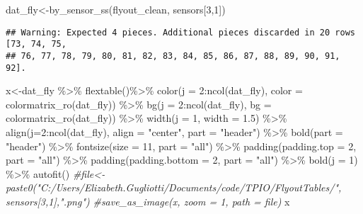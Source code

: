 \documentclass[
]{article}
\newenvironment{Shaded}{\begin{snugshade}}{\end{snugshade}}
\newcommand{\AttributeTok}[1]{\textcolor[rgb]{0.77,0.63,0.00}{#1}}
\newcommand{\CommentTok}[1]{\textcolor[rgb]{0.56,0.35,0.01}{\textit{#1}}}
\newcommand{\DecValTok}[1]{\textcolor[rgb]{0.00,0.00,0.81}{#1}}
\newcommand{\FloatTok}[1]{\textcolor[rgb]{0.00,0.00,0.81}{#1}}
\newcommand{\FunctionTok}[1]{\textcolor[rgb]{0.00,0.00,0.00}{#1}}
\newcommand{\NormalTok}[1]{#1}
\newcommand{\OtherTok}[1]{\textcolor[rgb]{0.56,0.35,0.01}{#1}}
\newcommand{\SpecialCharTok}[1]{\textcolor[rgb]{0.00,0.00,0.00}{#1}}
\newcommand{\StringTok}[1]{\textcolor[rgb]{0.31,0.60,0.02}{#1}}
\begin{document}
\begin{longtable}[c]{|p{2.27in}|p{1.97in}|p{1.97in}|p{1.97in}|p{1.97in}|p{1.97in}|p{1.66in}|p{1.66in}|p{1.66in}|p{1.66in}|p{1.66in}|p{1.66in}}
\end{longtable}

\begin{Shaded}
\begin{Highlighting}[]
\NormalTok{dat\_fly}\OtherTok{\textless{}{-}}\FunctionTok{by\_sensor\_ss}\NormalTok{(flyout\_clean, sensors[}\DecValTok{3}\NormalTok{,}\DecValTok{1}\NormalTok{])}
\end{Highlighting}
\end{Shaded}

\begin{verbatim}
## Warning: Expected 4 pieces. Additional pieces discarded in 20 rows [73, 74, 75,
## 76, 77, 78, 79, 80, 81, 82, 83, 84, 85, 86, 87, 88, 89, 90, 91, 92].
\end{verbatim}

\begin{Shaded}
\begin{Highlighting}[]
\NormalTok{x}\OtherTok{\textless{}{-}}\NormalTok{dat\_fly }\SpecialCharTok{\%\textgreater{}\%}
    \FunctionTok{flextable}\NormalTok{()}\SpecialCharTok{\%\textgreater{}\%}
    \FunctionTok{color}\NormalTok{(}\AttributeTok{j =} \DecValTok{2}\SpecialCharTok{:}\FunctionTok{ncol}\NormalTok{(dat\_fly), }\AttributeTok{color =} \FunctionTok{colormatrix\_ro}\NormalTok{(dat\_fly)) }\SpecialCharTok{\%\textgreater{}\%}
    \FunctionTok{bg}\NormalTok{(}\AttributeTok{j =} \DecValTok{2}\SpecialCharTok{:}\FunctionTok{ncol}\NormalTok{(dat\_fly), }\AttributeTok{bg =} \FunctionTok{colormatrix\_ro}\NormalTok{(dat\_fly)) }\SpecialCharTok{\%\textgreater{}\%}
    \FunctionTok{width}\NormalTok{(}\AttributeTok{j =} \DecValTok{1}\NormalTok{, }\AttributeTok{width =} \FloatTok{1.5}\NormalTok{) }\SpecialCharTok{\%\textgreater{}\%}
    \FunctionTok{align}\NormalTok{(}\AttributeTok{j=}\DecValTok{2}\SpecialCharTok{:}\FunctionTok{ncol}\NormalTok{(dat\_fly), }\AttributeTok{align =} \StringTok{"center"}\NormalTok{, }\AttributeTok{part =} \StringTok{"header"}\NormalTok{) }\SpecialCharTok{\%\textgreater{}\%}
    \FunctionTok{bold}\NormalTok{(}\AttributeTok{part =} \StringTok{"header"}\NormalTok{) }\SpecialCharTok{\%\textgreater{}\%}
    \FunctionTok{fontsize}\NormalTok{(}\AttributeTok{size =} \DecValTok{11}\NormalTok{, }\AttributeTok{part =} \StringTok{"all"}\NormalTok{) }\SpecialCharTok{\%\textgreater{}\%}
    \FunctionTok{padding}\NormalTok{(}\AttributeTok{padding.top =} \DecValTok{2}\NormalTok{, }\AttributeTok{part =} \StringTok{"all"}\NormalTok{) }\SpecialCharTok{\%\textgreater{}\%}
    \FunctionTok{padding}\NormalTok{(}\AttributeTok{padding.bottom =} \DecValTok{2}\NormalTok{, }\AttributeTok{part =} \StringTok{"all"}\NormalTok{) }\SpecialCharTok{\%\textgreater{}\%}
    \FunctionTok{bold}\NormalTok{(}\AttributeTok{j =} \DecValTok{1}\NormalTok{) }\SpecialCharTok{\%\textgreater{}\%} \FunctionTok{autofit}\NormalTok{()}
\CommentTok{\#file\textless{}{-}paste0("C:/Users/Elizabeth.Gugliotti/Documents/code/TPIO/FlyoutTables/", sensors[3,1],".png")}
\CommentTok{\#save\_as\_image(x, zoom = 1, path = file)}
\NormalTok{x}
\end{Highlighting}
\end{Shaded}
\end{document}
